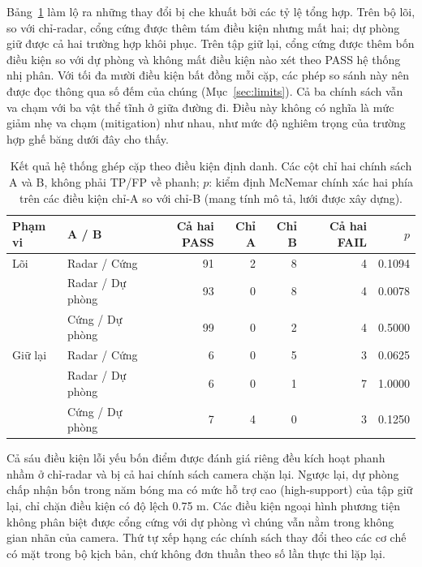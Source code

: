 \documentclass[11pt,a4paper]{article}
\begin{document}
Bảng~\ref{tab:paired} làm lộ ra những thay đổi bị che khuất bởi các tỷ lệ tổng
hợp. Trên bộ lõi, so với chỉ-radar, cổng cứng được thêm tám điều kiện nhưng
mất hai; dự phòng giữ được cả hai trường hợp khôi phục. Trên tập giữ lại, cổng
cứng được thêm bốn điều kiện so với dự phòng và không mất điều kiện nào xét
theo PASS hệ thống nhị phân. Với tối đa mười điều kiện bất đồng mỗi cặp, các
phép so sánh này nên được đọc thông qua số đếm của chúng
(Mục~\ref{sec:limits}). Cả ba chính sách
vẫn va chạm với ba vật thể tĩnh ở giữa đường đi. Điều này không có nghĩa là
mức giảm nhẹ va chạm (mitigation) như nhau, như mức độ nghiêm trọng của trường
hợp ghế băng dưới đây cho thấy.

\begin{table}[t]
\caption{Kết quả hệ thống ghép cặp theo điều kiện định danh. Các cột chỉ hai
chính sách A và B, không phải TP/FP về phanh; $p$: kiểm định McNemar chính xác
hai phía trên các điều kiện chỉ-A so với chỉ-B (mang tính mô tả, lưới được xây
dựng).}
\label{tab:paired}
\centering\small
\setlength{\tabcolsep}{4pt}
\begin{tabular*}{\textwidth}{@{\extracolsep{\fill}}llrrrrr}
\toprule Phạm vi & A / B & Cả hai PASS & Chỉ A & Chỉ B & Cả hai FAIL & $p$\\ \midrule
Lõi & Radar / Cứng & 91 & 2 & 8 & 4 & 0.1094\\
 & Radar / Dự phòng & 93 & 0 & 8 & 4 & 0.0078\\
 & Cứng / Dự phòng & 99 & 0 & 2 & 4 & 0.5000\\
Giữ lại & Radar / Cứng & 6 & 0 & 5 & 3 & 0.0625\\
 & Radar / Dự phòng & 6 & 0 & 1 & 7 & 1.0000\\
 & Cứng / Dự phòng & 7 & 4 & 0 & 3 & 0.1250\\
\bottomrule
\end{tabular*}
\end{table}

Cả sáu điều kiện lỗi yếu bốn điểm được đánh giá riêng đều kích hoạt phanh nhầm
ở chỉ-radar và bị cả hai chính sách camera chặn lại. Ngược lại, dự phòng chấp
nhận bốn trong năm bóng ma có mức hỗ trợ cao (high-support) của tập giữ lại,
chỉ chặn điều kiện có độ lệch 0.75 m. Các điều kiện ngoại hình phương tiện
không phân biệt được cổng cứng với dự phòng vì chúng vẫn nằm trong không gian
nhãn của camera. Thứ tự xếp hạng các chính sách thay đổi theo các cơ chế có
mặt trong bộ kịch bản, chứ không đơn thuần theo số lần thực thi lặp lại.
\end{document}

